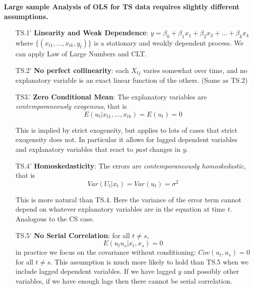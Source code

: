 \documentclass[11pt]{article}
\begin{document}
\begin{shaded}
\textbf{Large sample Analysis of OLS for TS data requires slightly different assumptions.}
\begin{center}
\begin{varwidth}{\textwidth}
        \begin{enumerate}
        \item [TS.1'] \textbf{Linearity and Weak Dependence}: $y = \beta_0 + \beta_1 x_1 + \beta_2 x_2 + \ldots + \beta_k x_k$
        where $\{(x_{t1}, \ldots, x_{tk}, y_t)\}$ is a stationary and weakly dependent process. We can apply Law of Large Numbers and CLT.
        \item [TS.2'] \textbf{No perfect collinearity}: each $X_{tj}$ varies somewhat over time, and no explanatory variable is an exact linear function of the others. (Same as TS.2)
        \item [TS3.'] \textbf{Zero Conditional Mean}: The explanatory variables are \textit{contemporaneously exogenous}, that is
        \[E(u_t|x_{t1}, \ldots, x_{tk}) = E(u_t) = 0\]
        \begin{note}
            This is implied by strict exogeneity, but applies to lots of cases that strict exogeneity does not. In particular it allows for lagged dependent variables and explanatory variables that react to \textit{past} changes in $y$.
        \end{note}
        \item [TS.4'] \textbf{Homoskedasticity}: The errors are \textit{contemporaneously homoskedastic}, that is
        \[Var(U_t|x_t) = Var(u_t) = \sigma^2\]

        \begin{note}
            This is more natural than TS.4. Here the variance of the error term cannot depend on whatever explanatory variables are in the equation at time $t$. Analogous to the CS case.
        \end{note}
        \item [TS.5'] \textbf{No Serial Correlation}: for all $t\neq s$,
        \[E(u_tu_s|x_t, x_s)=0\]
        in practice we focus on the covariance without conditioning: $Cov(u_t, u_s) = 0$ for all $t \neq s$. This assumption is much more likely to hold than TS.5 when we include lagged dependent variables. If we have lagged $y$ and possibly other variables, if we have enough lags then there cannot be serial correlation.
    \end{enumerate}
\end{varwidth}
\end{center}
\end{shaded}
\end{document}
